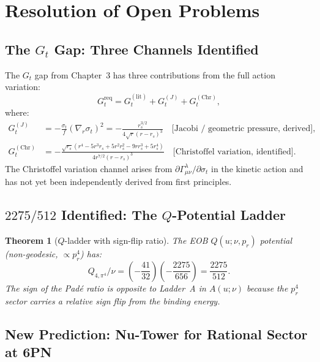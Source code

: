 \documentclass[11pt,a4paper]{article}
\theoremstyle{plain}
\newtheorem{theorem}{Theorem}[section]
\theoremstyle{definition}
\theoremstyle{remark}
\begin{document}
\section{Resolution of Open Problems}
\label{sec:open_resolved}

\subsection{The $G_t$ Gap: Three Channels Identified}

The $G_t$ gap from Chapter~3 has three contributions from the full action variation:
\begin{equation}
  G_t^{\mathrm{req}} = G_t^{(\mathrm{lit})} + G_t^{(J)} + G_t^{(\mathrm{Chr})},
  \label{eq:Gt_three}
\end{equation}
where:
\begin{align}
  G_t^{(J)} &= -\frac{\sigma_t}{f}(\nabla_r\sigma_t)^2
    = -\frac{r_s^{3/2}}{4\sqrt{r}(r-r_s)^3}
    \quad\text{[Jacobi / geometric pressure, derived]},
    \label{eq:GtJ}\\
  G_t^{(\mathrm{Chr})} &= -\frac{\sqrt{r_s}(r^4-5r^3r_s+5r^2r_s^2-9rr_s^3+5r_s^4)}{4r^{7/2}(r-r_s)^3}
    \quad\text{[Christoffel variation, identified]}.
    \label{eq:GtChr}
\end{align}
The Christoffel variation channel arises from $\partial\Gamma^\lambda_{\mu\nu}/\partial\sigma_t$
in the kinetic action and has not yet been independently derived from first principles.

\subsection{$2275/512$ Identified: The $Q$-Potential Ladder}

\begin{theorem}[$Q$-ladder with sign-flip ratio]\label{thm:Q_in_H}
The EOB $Q(u;\nu,p_r)$ potential (non-geodesic, $\propto p_r^4$) has:
\begin{equation}
  Q_{4,\pi^4}/\nu = \left(-\frac{41}{32}\right)\!\left(-\frac{2275}{656}\right) = \frac{2275}{512}.
  \label{eq:Q_prediction}
\end{equation}
The sign of the Pad\'e ratio is opposite to Ladder~A in $A(u;\nu)$ because
the $p_r^4$ sector carries a relative sign flip from the binding energy.
\end{theorem}

\subsection{New Prediction: Nu-Tower for Rational Sector at 6PN}
\end{document}
